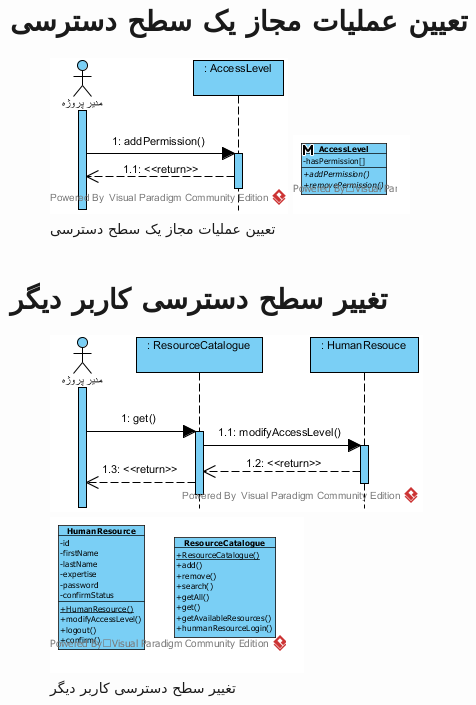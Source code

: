 \section{تعیین عملیات مجاز یک سطح دسترسی}
\begin{figure}[H]
	\centering
	\includegraphics[scale=1]{img/sequence-analysis/SetPermissions}
	
	
	\includegraphics[scale=1]{img/sequence-analysis/SetPermissionsC}
	\caption{تعیین عملیات مجاز یک سطح دسترسی}
\end{figure}


\section{تغییر سطح دسترسی کاربر دیگر}
\begin{figure}[H]
	\centering
	\includegraphics[scale=1]{img/sequence-analysis/ChangeAccessLevel}
	
	
	\includegraphics[scale=1]{img/sequence-analysis/ChangeAccessLevelC}
	\caption{تغییر سطح دسترسی کاربر دیگر}
\end{figure}


